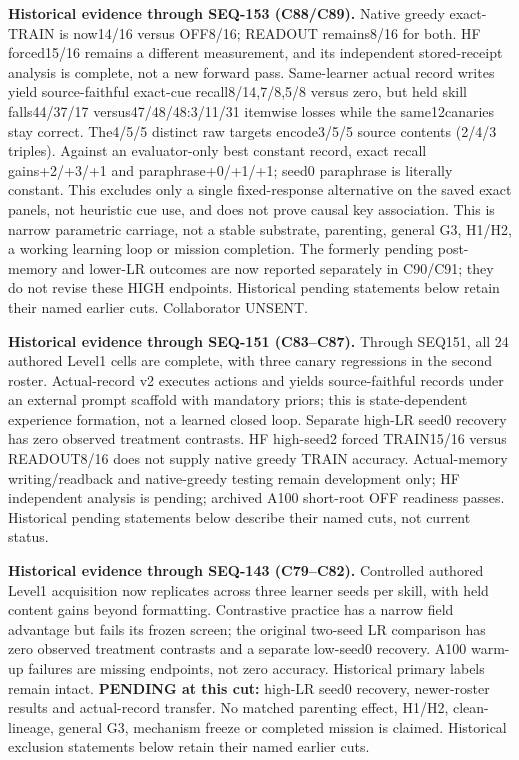 \documentclass[11pt]{article}
\begin{document}
\noindent\textbf{Historical evidence through SEQ-153 (C88/C89).}
Native greedy exact-TRAIN is now14/16 versus OFF8/16; READOUT remains8/16
for both. HF forced15/16 remains a different measurement, and its independent
stored-receipt analysis is complete, not a new forward pass. Same-learner actual
record writes yield source-faithful exact-cue recall8/14,7/8,5/8 versus zero,
but held skill falls44/37/17 versus47/48/48:3/11/31 itemwise losses while the
same12canaries stay correct. The4/5/5 distinct raw targets encode3/5/5 source
contents (2/4/3 triples). Against an evaluator-only best constant record, exact
recall gains+2/+3/+1 and paraphrase+0/+1/+1; seed0 paraphrase is literally
constant. This excludes only a single fixed-response alternative on the saved
exact panels, not heuristic cue use, and does not prove causal key association.
This is narrow parametric carriage, not a stable
substrate, parenting, general G3, H1/H2, a working learning loop or mission
completion. The formerly pending post-memory and lower-LR outcomes are now
reported separately in C90/C91; they do not revise these HIGH endpoints. Historical
pending statements below retain their named earlier cuts. Collaborator UNSENT.

\noindent\textbf{Historical evidence through SEQ-151 (C83--C87).}
Through SEQ151, all 24 authored Level1 cells are complete, with three canary
regressions in the second roster. Actual-record v2 executes actions and yields
source-faithful records under an external prompt scaffold with mandatory priors;
this is state-dependent experience formation, not a learned closed loop. Separate
high-LR seed0 recovery has zero observed treatment contrasts. HF high-seed2
forced TRAIN15/16 versus READOUT8/16 does not supply native greedy TRAIN accuracy.
Actual-memory writing/readback and native-greedy testing remain development only;
HF independent analysis is pending; archived A100 short-root OFF readiness passes.
Historical pending statements below describe their named cuts, not current status.

\noindent\textbf{Historical evidence through SEQ-143 (C79--C82).}
Controlled authored Level1 acquisition now replicates across three learner
seeds per skill, with held content gains beyond formatting. Contrastive practice
has a narrow field advantage but fails its frozen screen; the original two-seed
LR comparison has zero observed treatment contrasts and a separate low-seed0 recovery. A100 warm-up
failures are missing endpoints, not zero accuracy. Historical primary labels
remain intact. \textbf{PENDING at this cut:} high-LR seed0 recovery, newer-roster
results and actual-record transfer. No matched parenting effect, H1/H2,
clean-lineage, general G3, mechanism freeze or completed mission is claimed.
Historical exclusion statements below retain their named earlier cuts.
\end{document}
